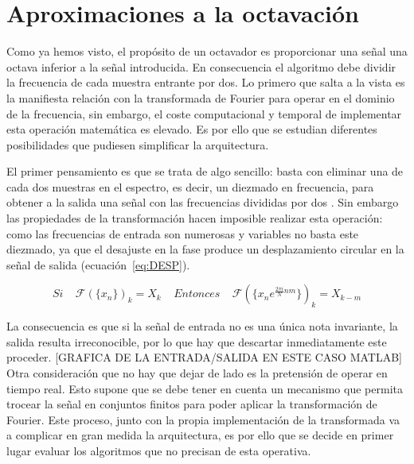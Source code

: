 \section{Aproximaciones a la octavación}
Como ya hemos visto, el propósito de un octavador es proporcionar una señal una octava inferior a la señal introducida. En consecuencia el algoritmo debe dividir la frecuencia de cada muestra entrante por dos. Lo primero que salta a la vista es la manifiesta relación con la transformada de Fourier para operar en el dominio de la frecuencia, sin embargo, el coste computacional y temporal de implementar esta operación matemática es elevado. Es por ello que se estudian diferentes posibilidades que pudiesen simplificar la arquitectura.

El primer pensamiento es que se trata de algo sencillo: basta con eliminar una de cada dos muestras en el espectro, es decir, un diezmado en frecuencia, para obtener a la salida una señal con las frecuencias divididas por dos \cite{Oppenheim}. Sin embargo las propiedades de la transformación hacen imposible realizar esta operación: como las frecuencias de entrada son numerosas y variables no basta este diezmado, ya que el desajuste en la fase produce un desplazamiento circular en la señal de salida (ecuación~\ref{eq:DESP}). 

\begin{equation}
\label{eq:DESP}
Si~~~~~\mathscr{F}(\{x_{n}\})_{k} = X_{k}~~~~~Entonces~~~~~\mathscr{F}(\{x_{n}e^{\frac{2\pi i}{N}nm}\})_{k}= X_{k-m} 
\end{equation}

La consecuencia es que si la señal de entrada no es una única nota invariante, la salida resulta irreconocible, por lo que  hay que descartar inmediatamente este proceder. [GRAFICA DE LA ENTRADA/SALIDA EN ESTE CASO MATLAB] Otra consideración que no hay que dejar de lado es la pretensión de operar en tiempo real. Esto supone que se debe tener en cuenta un mecanismo que permita trocear la señal en conjuntos finitos para poder aplicar la transformación de Fourier. Este proceso, junto con la propia implementación de la transformada va a complicar en gran medida la arquitectura, es por ello que se decide en primer lugar evaluar los algoritmos que no precisan de esta operativa.


